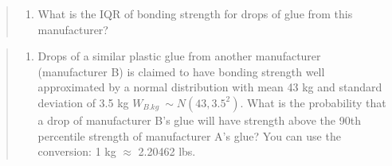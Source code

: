 \documentclass[
]{article}
\providecommand{\tightlist}{%
  \setlength{\itemsep}{0pt}\setlength{\parskip}{0pt}}
\begin{document}
\begin{quote}
\begin{enumerate}
\def\labelenumi{\alph{enumi}.}
\setcounter{enumi}{3}
\tightlist
\item
  What is the IQR of bonding strength for drops of glue from this
  manufacturer?
\end{enumerate}
\end{quote}

\begin{quote}
\begin{enumerate}
\def\labelenumi{\alph{enumi}.}
\setcounter{enumi}{4}
\tightlist
\item
  Drops of a similar plastic glue from another manufacturer
  (manufacturer B) is claimed to have bonding strength well approximated
  by a normal distribution with mean 43 kg and standard deviation of 3.5
  kg \(W_{B.kg}~\sim N(43, 3.5^2)\). What is the probability that a drop
  of manufacturer B's glue will have strength above the 90th percentile
  strength of manufacturer A's glue? You can use the conversion: 1 kg
  \(\approx\) 2.20462 lbs.
\end{enumerate}
\end{quote}
\end{document}
